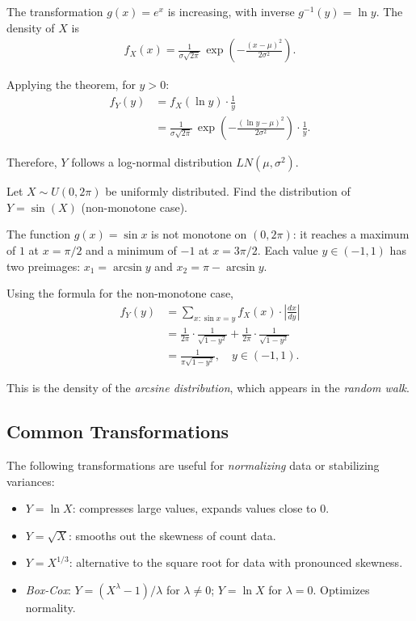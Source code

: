 \begin{solucion}
The transformation $g(x) = e^x$ is increasing, with inverse $g^{-1}(y) = \ln y$. The density of $X$ is
\begin{align}
 f_X(x) = \frac{1}{\sigma\sqrt{2\pi}}\,\exp\!\left(-\frac{(x-\mu)^2}{2\sigma^2}\right).
\end{align}

Applying the theorem, for $y > 0$:
\begin{align}
 f_Y(y) &= f_X(\ln y) \cdot \frac{1}{y} \\
 &= \frac{1}{\sigma\sqrt{2\pi}}\,\exp\!\left(-\frac{(\ln y - \mu)^2}{2\sigma^2}\right) \cdot \frac{1}{y}.
\end{align}

Therefore, $Y$ follows a log-normal distribution $LN(\mu, \sigma^2)$.
\end{solucion}

\begin{ejemplo}
 \label{exmp:3.2.4}
Let $X \sim U(0, 2\pi)$ be uniformly distributed. Find the distribution of $Y = \sin(X)$ (non-monotone case).
\end{ejemplo}

\begin{solucion}
The function $g(x) = \sin x$ is not monotone on $(0, 2\pi)$: it reaches a maximum of $1$ at $x = \pi/2$ and a minimum of $-1$ at $x = 3\pi/2$. Each value $y \in (-1, 1)$ has two preimages: $x_1 = \arcsin y$ and $x_2 = \pi - \arcsin y$.

Using the formula for the non-monotone case,
\begin{align}
 f_Y(y) &= \sum_{x: \sin x = y} f_X(x) \cdot \left|\frac{dx}{dy}\right| \\
 &= \frac{1}{2\pi}\cdot\frac{1}{\sqrt{1-y^2}} + \frac{1}{2\pi}\cdot\frac{1}{\sqrt{1-y^2}} \\
 &= \frac{1}{\pi\sqrt{1-y^2}}, \quad y \in (-1, 1).
\end{align}

This is the density of the \emph{arcsine distribution}, which appears in the \emph{random walk}.
\end{solucion}

\subsection{Common Transformations}

\begin{observacion}
The following transformations are useful for \emph{normalizing} data or stabilizing variances:
\begin{itemize}
 \item $Y = \ln X$: compresses large values, expands values close to $0$.
 \item $Y = \sqrt{X}$: smooths out the skewness of count data.
 \item $Y = X^{1/3}$: alternative to the square root for data with pronounced skewness.
 \item \emph{Box-Cox}: $Y = (X^\lambda - 1)/\lambda$ for $\lambda \neq 0$; $Y = \ln X$ for $\lambda = 0$. Optimizes normality.
\end{itemize}
\end{observacion}

